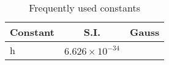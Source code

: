 \begin{table}
    \caption{Frequently used constants}
    \label{tab:constants}
    \begin{center}
	\begin{tabular}{l|cc}
	    \hline
	    Constant    & S.I.  & Gauss \\
	    \hline
	    h	& $6.626\times10^{-34}$	&   \\
	    \hline
	\end{tabular}
    \end{center}
\end{table}

